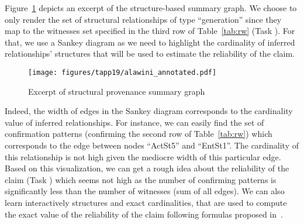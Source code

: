 Figure~\ref{fig:corroboration} depicts an excerpt of the structure-based summary graph. We choose to only render  the set of structural relationships of type ``generation'' since they map to the witnesses set specified in the third row of Table~\ref{tab:rw} (Task ). For that, we use a Sankey diagram as we need to highlight the cardinality of inferred relationships' structures that will be used to estimate the reliability of the claim.
\begin{figure}[t]
 \texttt{[image: figures/tapp19/alawini\_annotated.pdf]}
 \caption{Excerpt of structural provenance summary graph}
 \label{fig:corroboration}
\end{figure}
Indeed, the width of edges in the Sankey diagram corresponds to the cardinality value of inferred relationships.
For instance, we can easily find the set of confirmation patterns (confirming the second row of Table~\ref{tab:rw}) which corresponds to the edge between nodes ``ActSt5'' and ``EntSt1''. The cardinality of this relationship is not high given the mediocre width of this particular edge. Based on this visualization, 
we can get a rough idea about the reliability of the claim (Task ) which seems not high as the number of confirming patterns is significantly less than the number of witnesses (sum of all edges).
We can also learn interactively structures and exact cardinalities, that are used to compute the exact value of the reliability of the claim following formulas proposed in~\cite{Barakat:17}.




